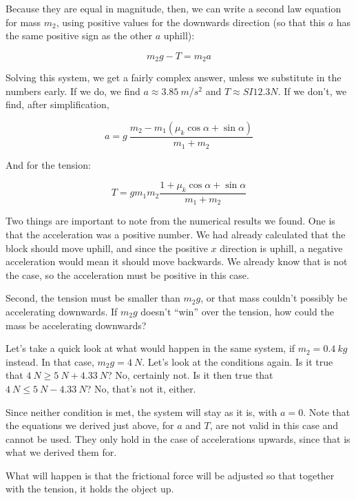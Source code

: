 \documentclass[12pt,a4paper]{report}
\begin{document}
Because they are equal in magnitude, then, we can write a second law equation for mass $m_2$, using positive values for the downwards direction (so that this $a$ has the same positive sign as the other $a$ uphill):

\begin{equation}
m_2 g - T = m_2 a
\end{equation}

Solving this system, we get a fairly complex answer, unless we substitute in the numbers early. If we do, we find $a \approx \SI{3.85}{m/s^2}$ and $T \approx {SI}{12.3}{N}$. If we don't, we find, after simplification,

\begin{equation}
a = g\ \frac{m_2 - m_1 (\mu_k \cos \alpha + \sin \alpha)}{m_1 + m_2}
\end{equation}

And for the tension:

\begin{equation}
T = g m_1 m_2 \frac{1 + \mu_k \cos\alpha + \sin \alpha}{m_1 + m_2}
\end{equation}

Two things are important to note from the numerical results we found. One is that the acceleration was a positive number. We had already calculated that the block should move uphill, and since the positive $x$ direction is uphill, a negative acceleration would mean it should move backwards. We already know that is not the case, so the acceleration must be positive in this case.

Second, the tension must be smaller than $m_2 g$, or that mass couldn't possibly be accelerating downwards. If $m_2 g$ doesn't ``win'' over the tension, how could the mass be accelerating downwards?

Let's take a quick look at what would happen in the same system, if $m_2 = \SI{0.4}{kg}$ instead. In that case, $m_2 g = \SI{4}{N}$. Let's look at the conditions again. Is it true that $\SI{4}{N} \ge \SI{5}{N} + \SI{4.33}{N}$? No, certainly not. Is it then true that $\SI{4}{N} \le \SI{5}{N} - \SI{4.33}{N}$? No, that's not it, either.

Since neither condition is met, the system will stay as it is, with $a = 0$. Note that the equations we derived just above, for $a$ and $T$, are not valid in this case and cannot be used. They only hold in the case of accelerations upwards, since that is what we derived them for.

What will happen is that the frictional force will be adjusted so that together with the tension, it holds the object up.
\end{document}
